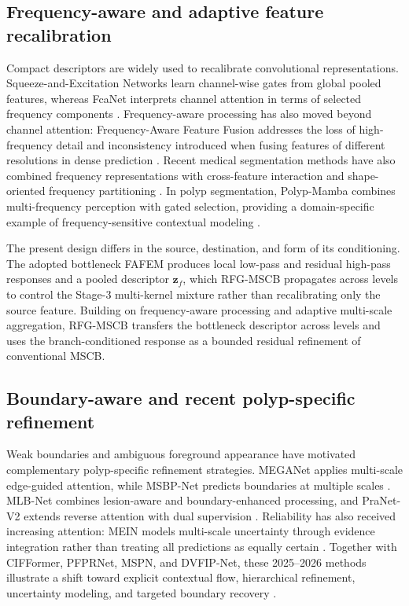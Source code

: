 \subsection{Frequency-aware and adaptive feature recalibration}

Compact descriptors are widely used to recalibrate convolutional representations.
Squeeze-and-Excitation Networks learn channel-wise gates from global pooled features,
whereas FcaNet interprets channel attention in terms of selected frequency components
\cite{senet,fcanet}. Frequency-aware processing has also moved beyond channel
attention: Frequency-Aware Feature Fusion addresses the loss of high-frequency detail
and inconsistency introduced when fusing features of different resolutions in dense
prediction \cite{freqfusion}. Recent medical segmentation methods have also combined
frequency representations with cross-feature interaction and shape-oriented frequency
partitioning \cite{fainet,shapefrequency}. In polyp segmentation, Polyp-Mamba combines
multi-frequency perception with gated selection, providing a domain-specific example
of frequency-sensitive contextual modeling \cite{polypmamba}.

The present design differs in the source, destination, and form of its conditioning.
The adopted bottleneck FAFEM produces local low-pass and residual high-pass responses
and a pooled descriptor $\mathbf{z}_f$, which RFG-MSCB propagates across levels to
control the Stage-3 multi-kernel mixture rather than recalibrating only the source
feature. Building on frequency-aware processing and adaptive multi-scale aggregation,
RFG-MSCB transfers the bottleneck descriptor across levels and uses the
branch-conditioned response as a bounded residual refinement of conventional MSCB.

\subsection{Boundary-aware and recent polyp-specific refinement}

Weak boundaries and ambiguous foreground appearance have motivated complementary
polyp-specific refinement strategies. MEGANet applies multi-scale edge-guided
attention, while MSBP-Net predicts boundaries at multiple scales
\cite{meganet,msbpnet}. MLB-Net combines lesion-aware and boundary-enhanced
processing, and PraNet-V2 extends reverse attention with dual supervision
\cite{mlbnet,pranetv2}. Reliability has also received increasing attention: MEIN
models multi-scale uncertainty through evidence integration rather than treating all
predictions as equally certain \cite{mein}. Together with CIFFormer, PFPRNet, MSPN,
and DVFIP-Net, these 2025--2026 methods illustrate a shift toward explicit contextual
flow, hierarchical refinement, uncertainty modeling, and targeted boundary recovery
\cite{cifformer,pfprnet,mspn,dvfipnet}.

